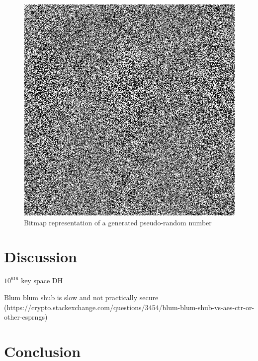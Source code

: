 \documentclass{article}
\begin{document}
\begin{figure}[ht]
    \centering
    \includegraphics[scale=0.4]{img/bitmap_bbs.png}
    \caption{Bitmap representation of a generated pseudo-random number}
    \label{fig:bitmap_bbs}
\end{figure}


\section{Discussion}

$10^{616}$ key space DH

Blum blum shub is slow and not practically secure (https://crypto.stackexchange.com/questions/3454/blum-blum-shub-vs-aes-ctr-or-other-csprngs)

\section{Conclusion}





\end{document}
